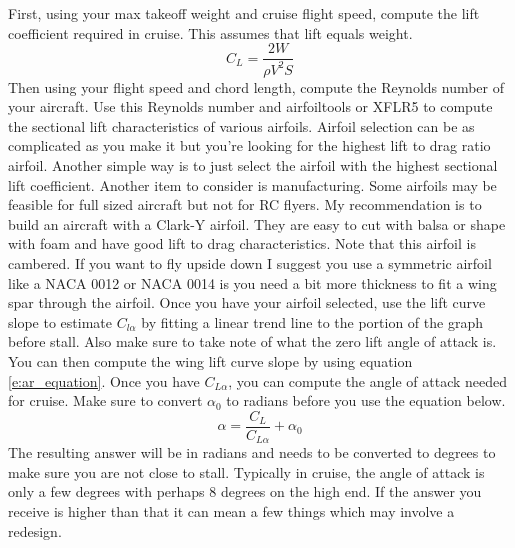 \documentclass{article}
\begin{document}
First, using your max takeoff weight and cruise flight speed, compute
the lift coefficient required in cruise. This assumes that lift equals
weight. 
\begin{equation}
C_L = \frac{2W}{\rho V^2 S}
\end{equation}
Then using your flight speed and chord length, compute the Reynolds number
of your aircraft. Use this Reynolds number and airfoiltools or XFLR5
to compute the sectional lift characteristics of various
airfoils. Airfoil selection can be as complicated as you make it but
you're looking for the highest lift to drag ratio airfoil. Another
simple way is to just select the airfoil with the highest sectional
lift coefficient. Another item to consider is manufacturing. Some
airfoils may be feasible for full sized aircraft but not for RC
flyers. My recommendation is to build an aircraft with a Clark-Y
airfoil. They are easy to cut with balsa or shape with foam and have
good lift to drag characteristics. Note that this airfoil is
cambered. If you want to fly upside down I suggest you use a symmetric
airfoil like a NACA 0012 or NACA 0014 is you need a bit more thickness
to fit a wing spar through the airfoil.
Once you have your airfoil selected, use the lift curve slope to
estimate $C_{l\alpha}$ by fitting a linear trend line to the portion
of the graph before stall. Also make sure to take note of what the
zero lift angle of attack is. You can then compute the wing lift curve
slope by using equation \ref{e:ar_equation}. Once you have
$C_{L\alpha}$, you can compute the angle of attack needed for
cruise. Make sure to convert $\alpha_0$ to radians before you use the
equation below.
\begin{equation}
\alpha = \frac{C_L}{C_{L\alpha}}+\alpha_0
\end{equation}
The resulting answer will be in radians and needs to be converted to
degrees to make sure you are not close to stall. Typically in cruise,
the angle of attack is only a few degrees with perhaps 8 degrees on
the high end. If the answer you receive is higher than that it can
mean a few things which may involve a redesign.
\end{document}
